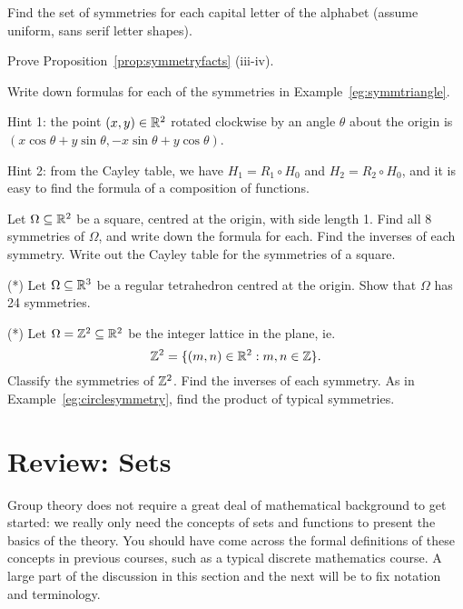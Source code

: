 \begin{exercises}
  \item Find the set of symmetries for each capital letter of the alphabet
    (assume uniform, sans serif letter shapes).
  
  \item Prove Proposition~\ref{prop:symmetryfacts} (iii-iv).
  
  \item Write down formulas for each of the symmetries in
    Example~\ref{eg:symmtriangle}.
    
    Hint 1: the point $(x,y) \in \mathbb{R}^{2}$ rotated clockwise by an angle
    $\theta$ about the origin is $(x\cos \theta + y\sin \theta, -x\sin \theta +
    y\cos \theta)$.
    
    Hint 2: from the Cayley table, we have $H_{1} = R_{1} \circ H_{0}$ and
    $H_{2} = R_{2} \circ H_{0}$, and it is easy to find the formula of a
    composition of functions.
  
  \item Let $\Omega \subseteq \mathbb{R}^{2}$ be a square, centred at the origin,
    with side length 1.
    Find all 8 symmetries of $\Omega$, and write down the formula for each. 
    Find the inverses of each symmetry.
    Write out the Cayley table for the symmetries of a square.
  
  \item\label{ex:symtetra} (*) Let $\Omega \subseteq \mathbb{R}^{3}$ be a regular tetrahedron
    centred at the origin.  Show that $\Omega$ has 24 symmetries.
  
  \item (*) Let $\Omega = \mathbb{Z}^{2} \subseteq \mathbb{R}^{2}$ be the integer
    lattice in the plane, ie.
    \[
      \mathbb{Z}^{2} = \{ (m,n) \in \mathbb{R}^{2} : m, n \in \mathbb{Z} \}.
    \]
    Classify the symmetries of $\mathbb{Z}^{2}$.
    Find the inverses of each symmetry.
    As in Example~\ref{eg:circlesymmetry}, find the product of typical symmetries.
\end{exercises}

\section{Review: Sets}

Group theory does not require a great deal of mathematical background to
get started: we really only need the concepts of sets and functions to
present the basics of the theory. You should have come across the formal definitions of
these concepts in previous courses, such as a typical discrete mathematics
course.  A large part of the discussion in this section and the next will be
to fix notation and terminology.

